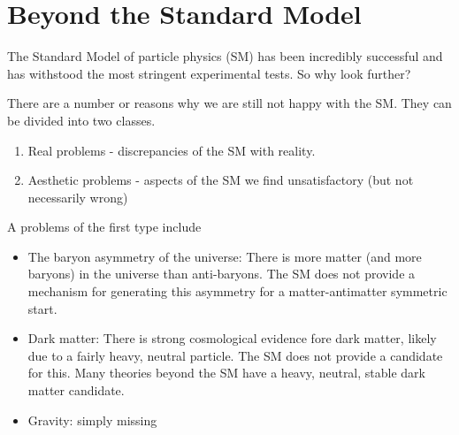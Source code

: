 \section{Beyond the Standard Model}
The Standard Model of particle physics (SM) has been incredibly successful and has withstood the most stringent experimental tests. So why look further?

There are a number or reasons why we are still not happy with the SM. They can be divided into two classes.
\begin{enumerate}
\item Real problems - discrepancies of the SM with reality.
\item Aesthetic problems - aspects of the SM we find unsatisfactory (but not necessarily wrong)
\end{enumerate}

A problems of the first type include
\begin{itemize}
\item The baryon asymmetry of the universe: There is more matter (and more baryons) in the universe than anti-baryons. The SM does not provide a mechanism for generating this asymmetry for a matter-antimatter symmetric start.
\item Dark matter: There is strong cosmological evidence fore dark matter, likely due to a fairly heavy, neutral particle. The SM does not provide a candidate for this. Many theories beyond the SM have a heavy, neutral, stable dark matter candidate.
\item Gravity: simply missing
\end{itemize}

